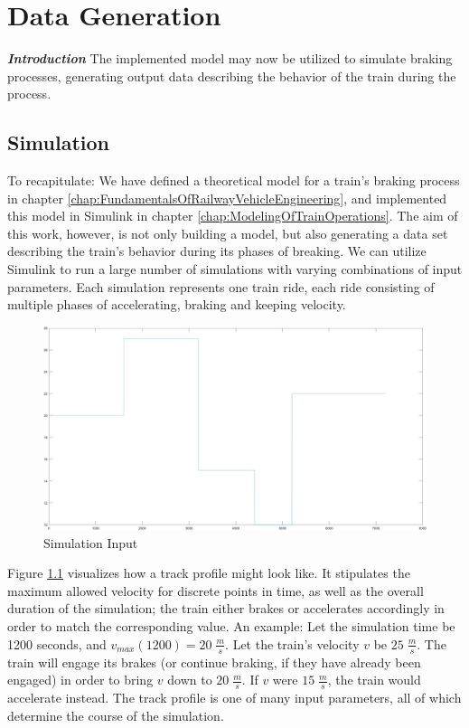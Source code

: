 \chapter{Data Generation}
\label{chap:DataGeneration}
\par\noindent
\textit{\textbf{Introduction}} The implemented model may now be utilized to simulate braking processes, generating output data describing the behavior of the train during the process. 

\section{Simulation}
\label{sec:Simulation}
\par\noindent
To recapitulate: We have defined a theoretical model for a train's braking process in chapter \ref{chap:FundamentalsOfRailwayVehicleEngineering}, and implemented this model in Simulink in chapter \ref{chap:ModelingOfTrainOperations}. The aim of this work, however, is not only building a model, but also generating a data set describing the train's behavior during its phases of breaking. We can utilize Simulink to run a large number of simulations with varying combinations of input parameters. Each simulation represents one train ride, each ride consisting of multiple phases of accelerating, braking and keeping velocity. 

\begin{figure}[H]
	\centering
	\includegraphics[width=\linewidth]{./pic/input}
	\caption{Simulation Input}
	\label{fig:siminput}
\end{figure}

\par\noindent
Figure \ref{fig:siminput} visualizes how a track profile might look like. It stipulates the maximum allowed velocity for discrete points in time, as well as the overall duration of the simulation; the train either brakes or accelerates accordingly in order to match the corresponding value. An example: Let the simulation time be 1200 seconds, and $v_{max}(1200)=20 \; \frac{m}{s}$. Let the train's velocity $v$ be $25 \; \frac{m}{s}$. The train will engage its brakes (or continue braking, if they have already been engaged) in order to bring $v$ down to $20 \; \frac{m}{s}$. If $v$ were $15 \; \frac{m}{s}$, the train would accelerate instead. The track profile is one of many input parameters, all of which determine the course of the simulation. 

